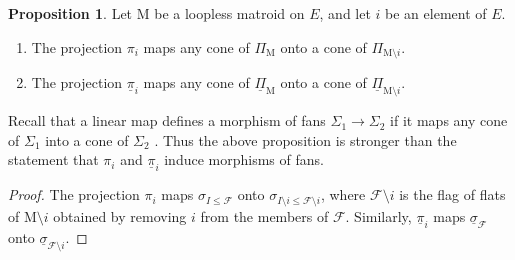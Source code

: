 \documentclass[11pt,reqno]{amsart}
\theoremstyle{definition}
\newtheorem{proposition}[theorem]{Proposition}
\theoremstyle{remark}
\renewcommand{\(}{\left(}
\renewcommand{\)}{\right)}
\newcommand{\<}{\left<}
\renewcommand{\>}{\right>}
\begin{document}
\begin{proposition}\label{PropositionConeToCone}
Let $\mathrm{M}$ be a loopless matroid on $E$, and let $i$ be an element of $E$.
\begin{enumerate}[(1)]\itemsep 5pt
\item The projection $\pi_i$ maps any cone of   $\Pi_\mathrm{M}$ onto a cone of  $\Pi_{\mathrm{M} \setminus i}$.
\item  The projection $\underline{\pi}_i$ maps any cone of  $\underline{\Pi}_\mathrm{M}$ onto a cone of  $\underline{\Pi}_{\mathrm{M} \setminus i}$. 
\end{enumerate}
\end{proposition}

Recall that a linear map defines a morphism of fans $\Sigma_1 \to \Sigma_2$ if it maps any cone of $\Sigma_1$ into a cone of $\Sigma_2$ \cite[Chapter 3]{CLS}.
Thus the above proposition is  stronger than the statement that 
$\pi_i$ and $\underline{\pi}_i$ induce morphisms of fans. %

\begin{proof}
The projection $\pi_i$ maps $\sigma_{I \le \mathscr{F}}$ onto $\sigma_{I \setminus i \le \mathscr{F} \setminus i}$, where $\mathscr{F} \setminus i$ is the flag of flats of $\mathrm{M}\setminus i$
obtained by removing $i$ from the members of $\mathscr{F}$. Similarly, $\underline{\pi}_i$ maps $\underline{\sigma}_{\mathscr{F}}$  onto  $\underline{\sigma}_{\mathscr{F}\setminus i}$. 
\end{proof}
\noindent

\end{document}
